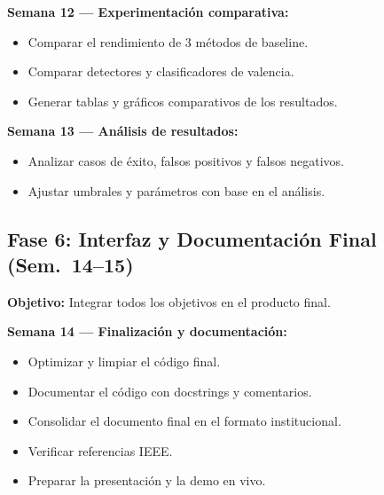 \textbf{Semana 12 — Experimentación comparativa:}
\begin{itemize}
    \item Comparar el rendimiento de 3 métodos de baseline.
    \item Comparar detectores y clasificadores de valencia.
    \item Generar tablas y gráficos comparativos de los resultados.
\end{itemize}

\textbf{Semana 13 — Análisis de resultados:}
\begin{itemize}
    \item Analizar casos de éxito, falsos positivos y falsos negativos.
    \item Ajustar umbrales y parámetros con base en el análisis.
\end{itemize}

\subsection{Fase 6: Interfaz y Documentación Final (Sem.\ 14--15)}

\textbf{Objetivo:} Integrar todos los objetivos en el producto final.

\textbf{Semana 14 — Finalización y documentación:}
\begin{itemize}
    \item Optimizar y limpiar el código final.
    \item Documentar el código con docstrings y comentarios.
    \item Consolidar el documento final en el formato institucional.
    \item Verificar referencias IEEE.
    \item Preparar la presentación y la demo en vivo.
\end{itemize}
